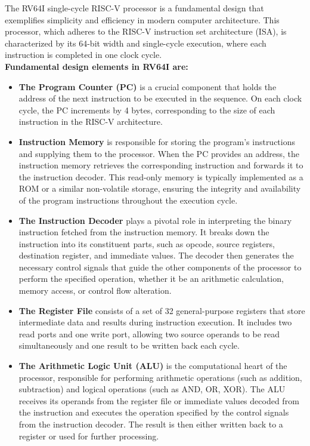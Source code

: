 \newpage
{}
The RV64I single-cycle RISC-V processor is a fundamental design that exemplifies simplicity and efficiency in modern computer architecture. This processor, which adheres to the RISC-V instruction set architecture (ISA), is characterized by its 64-bit width and single-cycle execution, where each instruction is completed in one clock cycle.\\
\vspace{\baselineskip}
\textbf{Fundamental design elements in RV64I are:}
\begin{itemize}
\item \textbf{The Program Counter (PC)} is a crucial component that holds the address of the next instruction to be executed in the sequence. On each clock cycle, the PC increments by 4 bytes, corresponding to the size of each instruction in the RISC-V architecture.
\item \textbf{Instruction Memory} is responsible for storing the program's instructions and supplying them to the processor. When the PC provides an address, the instruction memory retrieves the corresponding instruction and forwards it to the instruction decoder. This read-only memory is typically implemented as a ROM or a similar non-volatile storage, ensuring the integrity and availability of the program instructions throughout the execution cycle.
\item \textbf{The Instruction Decoder} plays a pivotal role in interpreting the binary instruction fetched from the instruction memory. It breaks down the instruction into its constituent parts, such as opcode, source registers, destination register, and immediate values. The decoder then generates the necessary control signals that guide the other components of the processor to perform the specified operation, whether it be an arithmetic calculation, memory access, or control flow alteration.
\item \textbf{The Register File} consists of a set of 32 general-purpose registers that store intermediate data and results during instruction execution. It includes two read ports and one write port, allowing two source operands to be read simultaneously and one result to be written back each cycle.
\item \textbf{The Arithmetic Logic Unit (ALU)} is the computational heart of the processor, responsible for performing arithmetic operations (such as addition, subtraction) and logical operations (such as AND, OR, XOR). The ALU receives its operands from the register file or immediate values decoded from the instruction and executes the operation specified by the control signals from the instruction decoder. The result is then either written back to a register or used for further processing.

\end{itemize}
